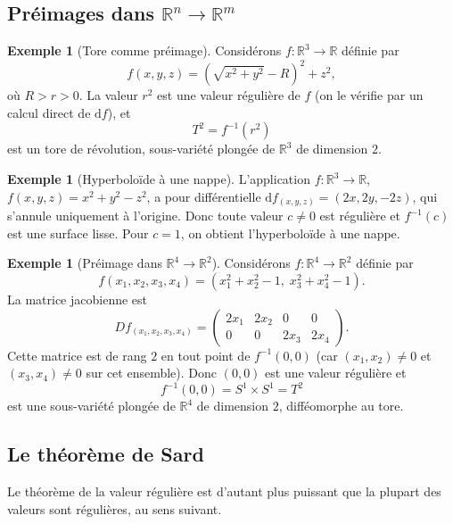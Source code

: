 \documentclass[12pt,a4paper,openany]{book}
\theoremstyle{definition}
\newtheorem{exemple}[definition]{Exemple}
\theoremstyle{plain}
\theoremstyle{remark}
\newcommand{\R}{\mathbb{R}}
\newcommand{\dd}{\mathrm{d}}
\begin{document}
\subsection{Préimages dans $\R^n \to \R^m$}\label{subsec:preimages-Rn-Rm}

\begin{exemple}[Tore comme préimage]\label{ex:tore-preimage}
Considérons $f : \R^3 \to \R$ définie par
\[
  f(x, y, z) = \left(\sqrt{x^2 + y^2} - R\right)^2 + z^2,
\]
où $R > r > 0$. La valeur $r^2$ est une valeur régulière de $f$
(on le vérifie par un calcul direct de $\dd f$), et
\[
  T^2 = f^{-1}(r^2)
\]
est un tore de révolution, sous-variété plongée de $\R^3$ de dimension $2$.
\end{exemple}

\begin{exemple}[Hyperboloïde à une nappe]\label{ex:hyperboloide}
L'application $f : \R^3 \to \R$, $f(x,y,z) = x^2 + y^2 - z^2$, a pour différentielle
$\dd f_{(x,y,z)} = (2x, 2y, -2z)$, qui s'annule uniquement à l'origine. Donc toute
valeur $c \neq 0$ est régulière et $f^{-1}(c)$ est une surface lisse.
Pour $c = 1$, on obtient l'hyperboloïde à une nappe.
\end{exemple}

\begin{exemple}[Préimage dans $\R^4 \to \R^2$]\label{ex:preimage-R4-R2}
Considérons $f : \R^4 \to \R^2$ définie par
\[
  f(x_1, x_2, x_3, x_4) = (x_1^2 + x_2^2 - 1,\; x_3^2 + x_4^2 - 1).
\]
La matrice jacobienne est
\[
  Df_{(x_1,x_2,x_3,x_4)} = \begin{pmatrix} 2x_1 & 2x_2 & 0 & 0 \\ 0 & 0 & 2x_3 & 2x_4 \end{pmatrix}.
\]
Cette matrice est de rang $2$ en tout point de $f^{-1}(0,0)$ (car $(x_1, x_2) \neq 0$
et $(x_3, x_4) \neq 0$ sur cet ensemble). Donc $(0,0)$ est une valeur régulière et
\[
  f^{-1}(0,0) = S^1 \times S^1 = T^2
\]
est une sous-variété plongée de $\R^4$ de dimension $2$, difféomorphe au tore.
\end{exemple}

\subsection{Le théorème de Sard}\label{subsec:sard}

Le théorème de la valeur régulière est d'autant plus puissant que la plupart
des valeurs sont régulières, au sens suivant.
\end{document}

